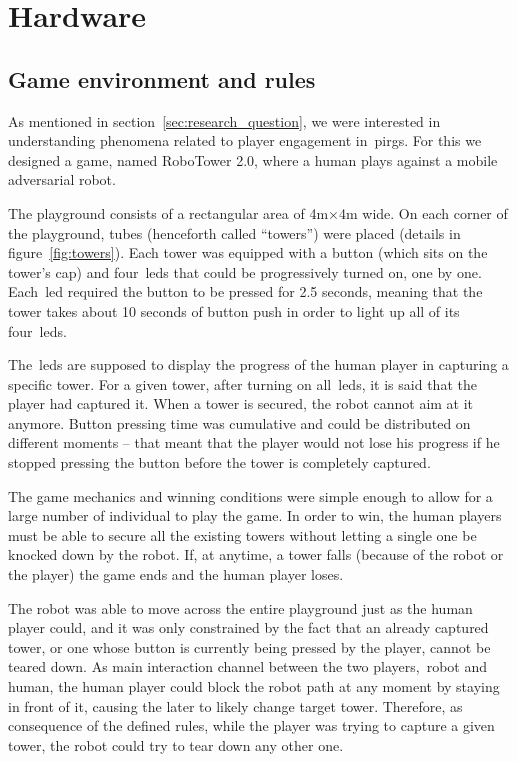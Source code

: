 \chapter{Hardware}\label{ch:foundation}
\section{Game environment and rules}\label{sec:game_environment}
As mentioned in section~\ref{sec:research_question}, we were interested in understanding phenomena related to player engagement in~\glspl{pirg}. For this we designed a game, named RoboTower 2.0, where a human plays against a mobile adversarial robot.

The playground consists of a rectangular area of 4m$\times$4m wide. On each corner of the playground, tubes (henceforth called ``towers'') were placed (details in figure~\ref{fig:towers}). Each tower was equipped with a button (which sits on the tower's cap) and four~\glspl{led} that could be progressively turned on, one by one.  Each~\gls{led} required the button to be pressed for 2.5 seconds, meaning that the tower takes about 10 seconds of button push in order to light up all of its four~\glspl{led}.

The~\glspl{led} are supposed to display the progress of the human player in capturing a specific tower. For a given tower, after turning on all~\glspl{led}, it is said that the player had captured it. When a tower is secured, the robot cannot aim at it anymore.
Button pressing time was cumulative and could be distributed on different moments -- that meant that the player would not lose his progress if he stopped pressing the button before the tower is completely captured. 

The game mechanics and winning conditions were simple enough to allow for a large number of individual to play the game. In order to win, the human players must be able to secure all the existing towers without letting a single one be knocked down by the robot. If, at anytime, a tower falls (because of the robot or the player) the game ends and the human player loses. 

The robot was able to move across the entire playground just as the human player could, and it was only constrained by the fact that an already captured tower, or one whose button is currently being pressed by the player, cannot be teared down. As main interaction channel between the two players,~\ie robot and human, the human player could block the robot path at any moment by staying in front of it, causing the later to likely change target tower. Therefore, as consequence of the defined rules, while the player was trying to capture a given tower, the robot could try to tear down any other one.

